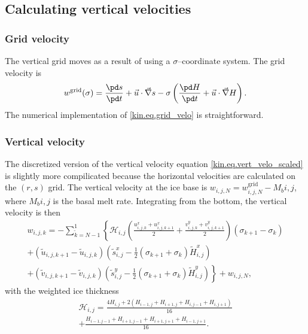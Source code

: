 \subsection{Calculating vertical velocities}

\subsubsection{Grid velocity}
The vertical grid moves as a result of using a $\sigma$--coordinate system. The grid velocity is
\begin{equation}
  \label{kin.eq.grid_velo}
  w^{\text{grid}}(\sigma)=\frac{\pd s}{\pd t}+\vec u\cdot\vec\nabla s-\sigma\left(\frac{\pd H}{\pd t}+\vec u\cdot\vec\nabla H\right).
\end{equation}
The numerical implementation of \eqref{kin.eq.grid_velo} is straightforward.

\subsubsection{Vertical velocity}
The discretized version of the vertical velocity equation \eqref{kin.eq.vert_velo_scaled} is slightly more compilicated because the horizontal velocities are calculated on the $(r,s)$ grid. The vertical velocity at the ice base is $w_{i,j,N}=w^{\text{grid}}_{i,j,N}-M_b{i,j}$, where $M_b{i,j}$ is the basal melt rate. Integrating from the bottom, the vertical velocity is then
\begin{equation}
  \label{kin.eq.wvel_unc}
  \begin{split}
  w_{i,j,k}=-\sum_{\tilde{k}=N-1}^1\left\{\mathcal{H}_{i,j}\left(\frac{u^x_{i,j,k}+u^x_{i,j,k+1}}{2}+\frac{v^y_{i,j,k}+v^y_{i,j,k+1}}{2}\right)(\sigma_{k+1}-\sigma_k)\right. \\
     +(\tilde{u}_{i,j,k+1}-\tilde{u}_{i,j,k})  \left(\tilde{s}^x_{i,j}-\frac12(\sigma_{k+1}+\sigma_k)\tilde{H}^x_{i,j}\right)  \\
     \left.+(\tilde{v}_{i,j,k+1}-\tilde{v}_{i,j,k})  \left(\tilde{s}^y_{i,j}-\frac12(\sigma_{k+1}+\sigma_k)\tilde{H}^y_{i,j}\right)\right\} + w_{i,j,N},
  \end{split}
\end{equation}
with the weighted ice thickness
\begin{equation*}
  \begin{split}
  \mathcal{H}_{i,j}=\frac{4H_{i,j}+2(H_{i-1,j}+H_{i+1,j}+H_{i,j-1}+H_{i,j+1})}{16}\\
  +\frac{H_{i-1,j-1}+H_{i+1,j-1}+H_{i+1,j+1}+H_{i-1,j+1}}{16}.    
  \end{split}
\end{equation*}

